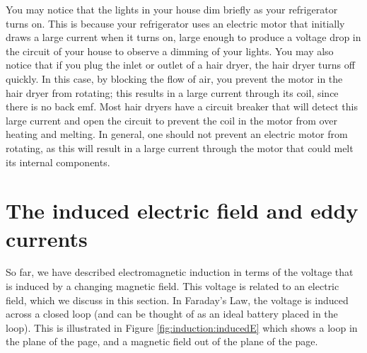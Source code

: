 You may notice that the lights in your house dim briefly as your refrigerator turns on. This is because your refrigerator uses an electric motor that initially draws a large current when it turns on, large enough to produce a voltage drop in the circuit of your house to observe a dimming of your lights. You may also notice that if you plug the inlet or outlet of a hair dryer, the hair dryer turns off quickly. In this case, by blocking the flow of air, you prevent the motor in the hair dryer from rotating; this results in a large current through its coil, since there is no back emf. Most hair dryers have a circuit breaker that will detect this large current and open the circuit to prevent the coil in the motor from over heating and melting. In general, one should not prevent an electric motor from rotating, as this will result in a large current through the motor that could melt its internal components. 

\section{The induced electric field and eddy currents}
So far, we have described electromagnetic induction in terms of the voltage that is induced by a changing magnetic field. This voltage is related to an electric field, which we discuss in this section. In Faraday's  Law, the voltage is induced across a closed loop (and can be thought of as an ideal battery placed in the loop). This is illustrated in Figure \ref{fig:induction:inducedE} which shows a loop in the plane of the page, and a magnetic field out of the plane of the page.

